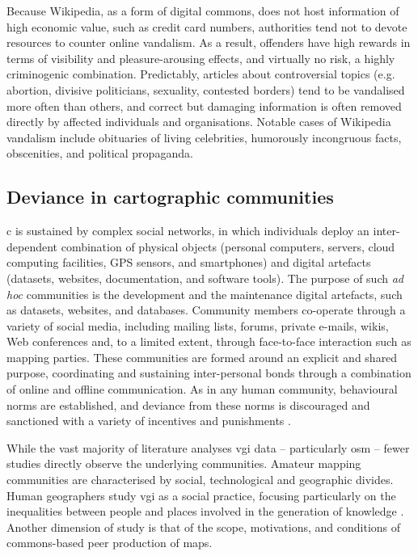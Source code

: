 \documentclass{article} \usepackage{graphicx,xspace}
\begin{document}
Because Wikipedia, as a form of digital commons, does not host information of high economic value, such as credit card numbers, authorities tend not to devote resources to counter online vandalism.
As a result, offenders have high rewards in terms of visibility and pleasure-arousing effects, and virtually no risk, a highly criminogenic combination.
Predictably, articles about controversial topics (e.g. abortion, divisive politicians, sexuality, contested borders) tend to be vandalised more often than others, and
correct but damaging information is often removed directly by affected individuals and organisations.
Notable cases of Wikipedia vandalism include obituaries of living celebrities, humorously incongruous facts, obscenities, and political propaganda. 




\subsection{Deviance in cartographic communities}
\label{sec:deviancevgi}

\Gls{c} is sustained by complex social networks, in which individuals deploy an inter-dependent combination of physical objects (personal computers, servers, cloud computing facilities, GPS sensors, and smartphones) and digital artefacts (datasets, websites, documentation, and software tools).  The purpose of such \emph{ad hoc} communities is the development and the maintenance  digital artefacts, such as datasets, websites, and databases.
Community members co-operate through a variety of social media, including mailing lists, forums, private e-mails, wikis, Web conferences and, to a limited extent, through face-to-face interaction such as mapping parties.
These communities are formed around an explicit and shared purpose, coordinating and sustaining inter-personal bonds through a combination of online and offline communication.
As in any human community, behavioural norms are established, and deviance from these norms is discouraged and sanctioned with a variety of incentives and punishments \citep{williams:2006:virtualcriminal}.



 
While the vast majority of literature analyses \gls{vgi} data -- particularly \gls{osm} \cite[e.g.][]{haklay:2010:good,mooney:2012:characteristics} -- fewer studies directly observe the underlying communities.
Amateur mapping communities are characterised by social, technological and geographic divides.
Human geographers study \gls{vgi} as a social practice, focusing particularly on the inequalities between people and places involved in the generation of knowledge \citep{elwood:2012:researching}. Another dimension of study is that of the scope, motivations, and conditions of commons-based peer production of maps.
\end{document}
